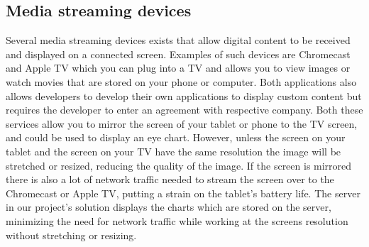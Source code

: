 \documentclass[12pt,a4paper,notitlepage]{report}
\begin{document}
\subsection{Media streaming devices}
Several media streaming devices exists that allow digital content to be received and displayed on a connected screen. Examples of such devices are Chromecast \cite{chromecast} and Apple TV \cite{appletv} which you can plug into a TV and allows you to view images or watch movies that are stored on your phone or computer. Both applications also allows developers to develop their own applications to display custom content but requires the developer to enter an agreement with respective company. Both these services allow you to mirror the screen of your tablet or phone to the TV screen, and could be used to display an eye chart. However, unless the screen on your tablet and the screen on your TV have the same resolution the image will be stretched or resized, reducing the quality of the image. If the screen is mirrored there is also a lot of network traffic needed to stream the screen over to the Chromecast or Apple TV, putting a strain on the tablet's battery life. The server in our project's solution displays the charts which are stored  on the server, minimizing the need for network traffic while working at the screens resolution without stretching or resizing.
\end{document}
